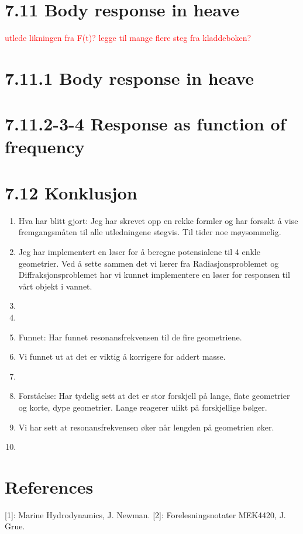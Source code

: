 \documentclass{article}
\begin{document}
\section{7.11 Body response in heave}

\textcolor{red}{utlede likningen fra F(t)? legge til mange flere steg fra kladdeboken?  }

\section{7.11.1 Body response in heave}


\section{7.11.2-3-4 Response as function of frequency}


\section{7.12 Konklusjon }


\begin{enumerate}
	\item Hva har blitt gjort: Jeg har skrevet opp en rekke formler     og har forsøkt å vise fremgangsmåten til alle utledningene stegvis. Til tider noe møysommelig.
	\item Jeg har implementert en løser for å beregne potensialene til 4 enkle geometrier. Ved å sette sammen det vi lærer fra Radiasjonsproblemet og Diffraksjonsproblemet har vi kunnet implementere en løser for responsen til vårt objekt i vannet.
	\item 
	\item 
	\item Funnet: Har funnet resonansfrekvensen til de fire geometriene.
	\item Vi funnet ut at det er viktig å korrigere for addert masse.
	\item  
	\item Forståelse: Har tydelig sett at det er stor forskjell på lange, flate geometrier og korte, dype geometrier. Lange reagerer ulikt på forskjellige bølger.
	\item Vi har sett at resonansfrekvensen øker når lengden på geometrien øker.
	\item 
\end{enumerate}


\section{References}
[1]: Marine Hydrodynamics, J. Newman.
[2]: Forelesningsnotater MEK4420, J. Grue. 
\end{document}
